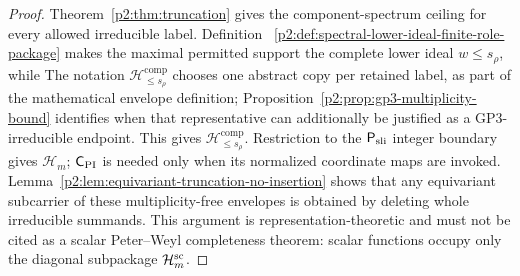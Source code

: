 \documentclass[11pt,a4paper]{article}
\begin{document}
\begin{proof}
Theorem~\ref{p2:thm:truncation} gives the component-spectrum ceiling for every
allowed irreducible label.  Definition~
\ref{p2:def:spectral-lower-ideal-finite-role-package} makes the maximal
permitted support the complete lower ideal \(w\le s_\rho\), while
The notation \(\mathcal H_{\le s_\rho}^{\mathrm{comp}}\) chooses one abstract
copy per retained label, as part of the mathematical envelope definition;
Proposition~\ref{p2:prop:gp3-multiplicity-bound} identifies when that
representative can additionally be justified as a GP3-irreducible endpoint.
This gives
\(\mathcal H_{\le s_\rho}^{\mathrm{comp}}\).  Restriction to the
\(\mathsf P_{\rm sli}\) integer boundary gives \(\mathcal H_m\);
\(\mathsf C_{\rm PI}\) is needed only when its normalized coordinate maps
are invoked.
Lemma~\ref{p2:lem:equivariant-truncation-no-insertion} shows that any
equivariant subcarrier of these multiplicity-free envelopes is obtained by
deleting whole irreducible summands.  This argument is
representation-theoretic and must not be cited as a scalar Peter--Weyl
completeness theorem: scalar functions occupy only the diagonal subpackage
\(\mathcal H_m^{\rm sc}\).
\end{proof}
\end{document}
